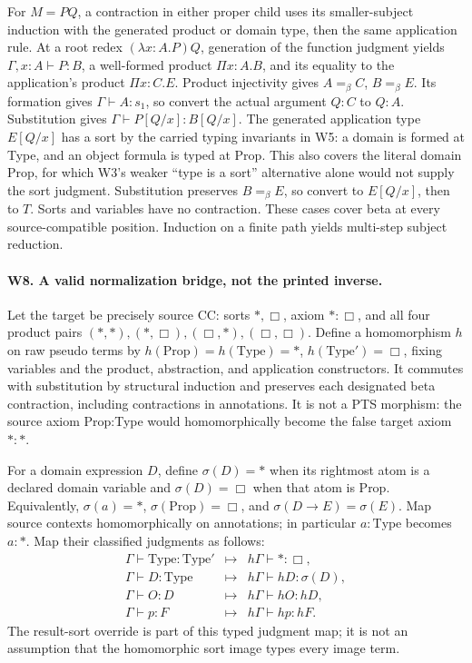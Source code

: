For \(M=PQ\), a contraction in either proper child uses its
smaller-subject induction with the generated product or domain type,
then the same application rule. At a root redex
\((\lambda x:A.P)Q\), generation of the function judgment yields
\(\Gamma,x:A\vdash P:B\), a well-formed product
\(\Pi x:A.B\), and its equality to the application's product
\(\Pi x:C.E\). Product injectivity gives \(A=_\beta C\),
\(B=_\beta E\). Its formation gives \(\Gamma\vdash A:s_1\),
so convert the actual argument \(Q:C\) to \(Q:A\). Substitution
gives \(\Gamma\vdash P[Q/x]:B[Q/x]\). The generated application
type \(E[Q/x]\) has a sort by the carried typing invariants in W5:
a domain is formed at Type, and an object formula is typed at Prop.
This also covers the literal domain Prop, for which W3's weaker
``type is a sort'' alternative alone would not supply the sort judgment.
Substitution preserves \(B=_\beta E\), so convert to
\(E[Q/x]\), then to \(T\). Sorts and variables have no contraction.
These cases cover beta at every source-compatible position.
Induction on a finite path yields multi-step subject reduction.

\paragraph{W8. A valid normalization bridge, not the printed inverse.}
Let the target be precisely source CC:
sorts \(\ast,\Box\), axiom \(\ast:\Box\), and all four product
pairs \((\ast,\ast),(\ast,\Box),(\Box,\ast),(\Box,\Box)\).
Define a homomorphism \(h\) on raw pseudo terms by
\(h(\mathrm{Prop})=h(\mathrm{Type})=\ast\),
\(h(\mathrm{Type}')=\Box\), fixing variables and the product,
abstraction, and application constructors. It commutes with substitution
by structural induction and preserves each designated beta contraction,
including contractions in annotations. It is not a PTS morphism:
the source axiom Prop:Type would homomorphically become the false
target axiom \(\ast:\ast\).

For a domain expression \(D\), define \(\sigma(D)=\ast\) when its
rightmost atom is a declared domain variable and \(\sigma(D)=\Box\)
when that atom is Prop. Equivalently, \(\sigma(a)=\ast\),
\(\sigma(\mathrm{Prop})=\Box\), and
\(\sigma(D\to E)=\sigma(E)\).
Map source contexts homomorphically on annotations; in particular
\(a:\mathrm{Type}\) becomes \(a:\ast\). Map their classified
judgments as follows:
\[
\begin{array}{rcl}
 \Gamma\vdash\mathrm{Type}:\mathrm{Type}'
   &\mapsto& h\Gamma\vdash\ast:\Box,\\
 \Gamma\vdash D:\mathrm{Type}
   &\mapsto& h\Gamma\vdash hD:\sigma(D),\\
 \Gamma\vdash O:D
   &\mapsto& h\Gamma\vdash hO:hD,\\
 \Gamma\vdash p:F
   &\mapsto& h\Gamma\vdash hp:hF.
\end{array}
\]
The result-sort override is part of this typed judgment map; it is not
an assumption that the homomorphic sort image types every image term.

